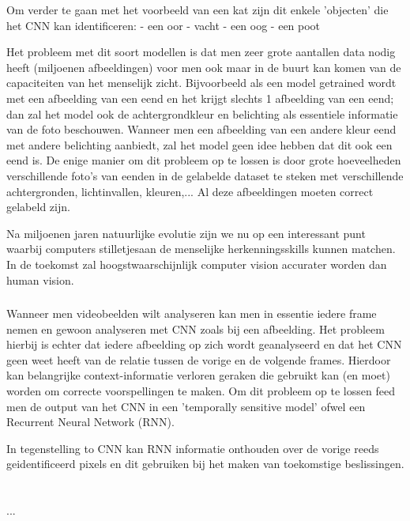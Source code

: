 Om verder te gaan met het voorbeeld van een kat zijn dit enkele 'objecten' die het CNN kan identificeren:
- een oor
- vacht
- een oog
- een poot

Het probleem met dit soort modellen is dat men zeer grote aantallen data nodig heeft (miljoenen afbeeldingen) voor men ook maar in de buurt kan komen van de capaciteiten van het menselijk zicht. Bijvoorbeeld als een model getrained wordt met een afbeelding van een eend en het krijgt slechts 1 afbeelding van een eend; dan zal het model ook de achtergrondkleur en belichting als essentiele informatie van de foto beschouwen. Wanneer men een afbeelding van een andere kleur eend met andere belichting aanbiedt, zal het model geen idee hebben dat dit ook een eend is. De enige manier om dit probleem op te lossen is door grote hoeveelheden verschillende foto's van eenden in de gelabelde dataset te steken met verschillende achtergronden, lichtinvallen, kleuren,... Al deze afbeeldingen moeten correct gelabeld zijn.

Na miljoenen jaren natuurlijke evolutie zijn we nu op een interessant punt waarbij computers stilletjesaan de menselijke herkenningsskills kunnen matchen. In de toekomst zal hoogstwaarschijnlijk computer vision accurater worden dan human vision.

\subsubsection{}
\label{sec:recurrent-neural-network}
Wanneer men videobeelden wilt analyseren kan men in essentie iedere frame nemen en gewoon analyseren met CNN zoals bij een afbeelding. Het probleem hierbij is echter dat iedere afbeelding op zich wordt geanalyseerd en dat het CNN geen weet heeft van de relatie tussen de vorige en de volgende frames. Hierdoor kan belangrijke context-informatie verloren geraken die gebruikt kan (en moet) worden om correcte voorspellingen te maken.
Om dit probleem op te lossen feed men de output van het CNN in een 'temporally sensitive model' ofwel een Recurrent Neural Network (RNN).

In tegenstelling to CNN kan RNN informatie onthouden over de vorige reeds geidentificeerd pixels en dit gebruiken bij het maken van toekomstige beslissingen.

\section{}
\label{sec:archiveren-van-fotos}
...